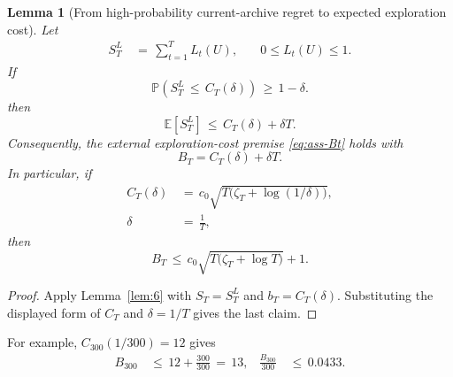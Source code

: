 \documentclass{article} %
\newtheorem{lemma}[theorem]{Lemma}
\begin{document}
\begin{lemma}[From high-probability current-archive regret to expected exploration cost]
\label{lem:16}
Let
\begin{equation}
\label{eq:app-six-ST-def}
\begin{aligned}
S_T^L
&\,=\,
\sum_{t=1}^{T}L_t(U),
&
\quad 0\leq L_t(U)\leq1.
\end{aligned}
\end{equation}
If
\begin{equation}
\label{eq:app-six-hp-event}
\mathbb{P}\!\left(S_T^L\,\le\, C_T(\delta)\right)\,\ge\, 1-\delta.
\end{equation}
then
\begin{equation}
\label{eq:app-six-expected-bridge}
\mathbb{E}[S_T^L]
\,\le\,
C_T(\delta)+\delta T.
\end{equation}
Consequently, the external exploration-cost premise
\eqref{eq:ass-Bt} holds with
\begin{equation}
\label{eq:app-six-BT-from-CT}
B_T
=
C_T(\delta)+\delta T.
\end{equation}
In particular, if
\begin{align}
\label{eq:app-six-generic-CT}
C_T(\delta)
&\,=\,
c_0\sqrt{T\bigl(\zeta_T+\log(1/\delta)\bigr)},
\\
\label{eq:app-six-delta-choice}
\delta
&\,=\,
\frac{1}{T},
\end{align}
then
\begin{equation}
\label{eq:app-six-generic-BT}
B_T
\,\le\,
c_0\sqrt{T\bigl(\zeta_T+\log T\bigr)}+1.
\end{equation}
\end{lemma}

\begin{proof}
Apply Lemma~\ref{lem:6} with \(S_T=S_T^L\) and
\(b_T=C_T(\delta)\). Substituting the displayed form of \(C_T\) and
\(\delta=1/T\) gives the last claim.
\end{proof}

For example, \(C_{300}(1/300)=12\) gives
\begin{equation}
\begin{aligned}
B_{300}
&\,\le\,
12+\frac{300}{300}
\,=\,13,
&
\frac{B_{300}}{300}
&\,\le\,
0.0433.
\end{aligned}
\end{equation}
\end{document}
